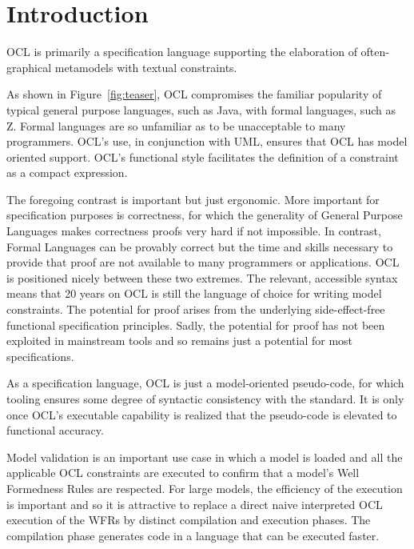 \documentclass[sigconf]{acmart}
\begin{document}
\maketitle

\section{Introduction}
OCL is primarily a specification language supporting the elaboration
of often-graphical metamodels with textual constraints.

As shown in Figure~\ref{fig:teaser}, OCL\cite{OCL-2.4} compromises the familiar popularity of typical general purpose languages, such as Java, with formal languages, such as Z. Formal languages are so unfamiliar as to be unacceptable to many programmers. OCL's use, in conjunction with UML\cite{UML-2.5.1}, ensures that OCL has model oriented support. OCL's functional style facilitates the definition of a constraint as a compact expression.

The foregoing contrast is important but just ergonomic. More important for specification purposes is correctness, for which the generality of General Purpose Languages makes correctness proofs very hard if not impossible. In contrast, Formal Languages can be provably correct but the time and skills necessary to provide that proof are not available to many programmers or applications. OCL is positioned nicely between these two extremes. The relevant, accessible syntax means that 20 years on OCL is still the language of choice for writing model constraints. The potential for proof arises from the underlying side-effect-free functional specification principles. Sadly, the potential for proof has not been exploited in mainstream tools and so remains just a potential for most specifications.

As a specification language, OCL is just a model-oriented pseudo-code, for which tooling ensures some degree of syntactic consistency with the standard. It is only once OCL's executable capability is realized that the pseudo-code is elevated to functional accuracy.

Model validation is an  important use case in which a model is loaded and all the applicable OCL constraints are executed to confirm that a model's Well Formedness Rules are respected. For large models, the efficiency of the execution is important and so it is attractive to replace a direct naive interpreted OCL execution of the WFRs by distinct compilation and execution phases. The compilation phase generates code in a language that can be executed faster.
\end{document}
